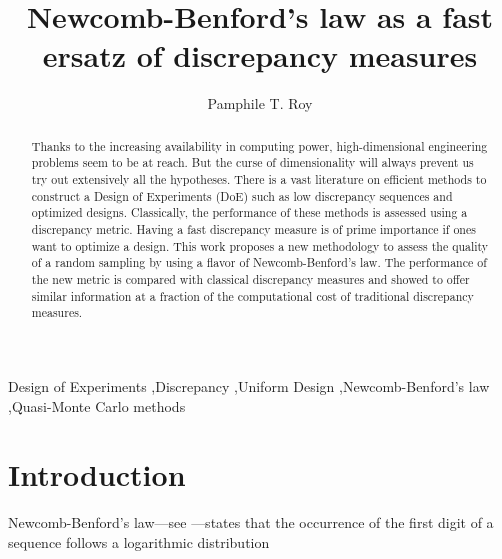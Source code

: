 \documentclass[1p]{elsarticle}
\begin{document}
\begin{frontmatter}


\title{Newcomb-Benford's law as a fast ersatz of discrepancy measures}

\author[1]{Pamphile T. Roy}



\address[1]{iTranslate GmbH, Gadollaplatz 1, 8010, Graz, Austria}


\begin{abstract}

Thanks to the increasing availability in computing power, high-dimensional engineering problems seem to be at reach. But the curse of dimensionality will always prevent us try out extensively all the hypotheses. There is a vast literature on efficient methods to construct a Design of Experiments (DoE) such as low discrepancy sequences and optimized designs. Classically, the performance of these methods is assessed using a discrepancy metric. Having a fast discrepancy measure is of prime importance if ones want to optimize a design. This work proposes a new methodology to assess the quality of a random sampling by using a flavor of Newcomb-Benford's law. The performance of the new metric is compared with classical discrepancy measures and showed to offer similar information at a fraction of the computational cost of traditional discrepancy measures.


\end{abstract}

\begin{keyword}
Design of Experiments \sep Discrepancy \sep Uniform Design \sep Newcomb-Benford's law \sep Quasi-Monte Carlo methods
\end{keyword}


\end{frontmatter}


\section{Introduction}



Newcomb-Benford's law---see \citep{Newcomb1881,Benford1938}---states that the occurrence of the first digit of a sequence follows a logarithmic distribution
\end{document}
